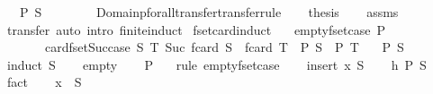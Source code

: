 \begin{isabellebody}
\ \ \ {\isachardoublequoteopen}P\ S{\isachardoublequoteclose}\isanewline
%
\isadelimproof
%
\endisadelimproof
%
\isatagproof
{}\isamarkupfalse%
\ {\isacharminus}\isanewline
\ \ \isanewline
\ \ \isamarkupfalse%
\ Domainp{\isacharunderscore}forall{\isacharunderscore}transfer{\isacharbrackleft}transfer{\isacharunderscore}rule{\isacharbrackright}\isanewline
\ \ \isamarkupfalse%
\ {\isacharquery}thesis\isanewline
\ \ \isamarkupfalse%
\ assms\ \isamarkupfalse%
\ transfer\ {\isacharparenleft}auto\ intro{\isacharcolon}\ finite{\isacharunderscore}induct{\isacharparenright}\isanewline
{}\isamarkupfalse%
%
\endisatagproof
{\isafoldproof}%
%
\isadelimproof
\isanewline
%
\endisadelimproof
\isanewline
{}\isamarkupfalse%
\ fset{\isacharunderscore}card{\isacharunderscore}induct{\isacharcolon}\isanewline
\ \ \ empty{\isacharunderscore}fset{\isacharunderscore}case{\isacharcolon}\ {\isachardoublequoteopen}P\ {\isacharbraceleft}{\isacharbar}{\isacharbar}{\isacharbraceright}{\isachardoublequoteclose}\isanewline
\ \ \ \ \ \ \ card{\isacharunderscore}fset{\isacharunderscore}Suc{\isacharunderscore}case{\isacharcolon}\ {\isachardoublequoteopen}{\isasymAnd}S\ T{\isachardot}\ Suc\ {\isacharparenleft}fcard\ S{\isacharparenright}\ {\isacharequal}\ {\isacharparenleft}fcard\ T{\isacharparenright}\ {\isasymLongrightarrow}\ P\ S\ {\isasymLongrightarrow}\ P\ T{\isachardoublequoteclose}\isanewline
\ \ \ {\isachardoublequoteopen}P\ S{\isachardoublequoteclose}\isanewline
%
\isadelimproof
%
\endisadelimproof
%
\isatagproof
{}\isamarkupfalse%
\ {\isacharparenleft}induct\ S{\isacharparenright}\isanewline
\ \ \isamarkupfalse%
\ empty\isanewline
\ \ \isamarkupfalse%
\ {\isachardoublequoteopen}P\ {\isacharbraceleft}{\isacharbar}{\isacharbar}{\isacharbraceright}{\isachardoublequoteclose}\ \isamarkupfalse%
\ {\isacharparenleft}rule\ empty{\isacharunderscore}fset{\isacharunderscore}case{\isacharparenright}\isanewline
{}\isamarkupfalse%
\isanewline
\ \ \isamarkupfalse%
\ {\isacharparenleft}insert\ x\ S{\isacharparenright}\isanewline
\ \ \isamarkupfalse%
\ h{\isacharcolon}\ {\isachardoublequoteopen}P\ S{\isachardoublequoteclose}\ \isamarkupfalse%
\ fact\isanewline
\ \ \isamarkupfalse%
\ {\isachardoublequoteopen}x\ {\isacharbar}{\isasymnotin}{\isacharbar}\ S{\isachardoublequoteclose}\ \isamarkupfalse%

\end{isabellebody}
